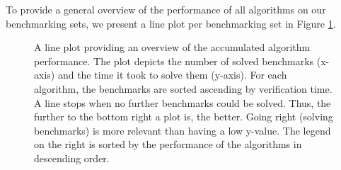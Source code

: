 To provide a general overview of the performance of all algorithms on our benchmarking sets, we present a line plot per benchmarking set in Figure \ref{fig:AlgoPerformance}.
\begin{figure}[h!]
    \centering
    \qquad
    \caption[Overview of Algorithm Performance]{
        A line plot providing an overview of the accumulated algorithm performance.
        The plot depicts the number of solved benchmarks (x-axis) and the time it took to solve them (y-axis). 
        For each algorithm, the benchmarks are sorted ascending by verification time. A line stops when no further benchmarks could be solved.
        Thus, the further to the bottom right a plot is, the better. Going right (solving benchmarks) is more relevant than having a low y-value.
        The legend on the right is sorted by the performance of the algorithms in descending order.
        }%
    \label{fig:AlgoPerformance}
\end{figure}


